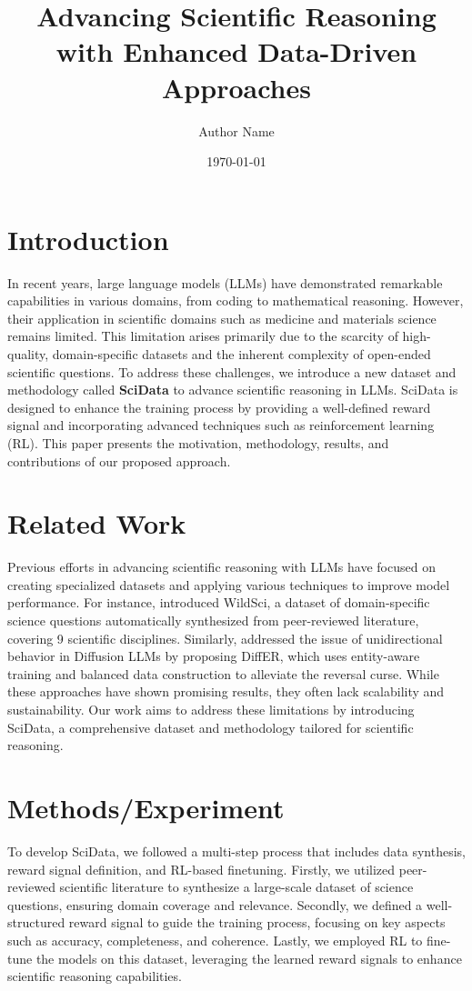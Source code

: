 \documentclass{article}
\title{Advancing Scientific Reasoning with Enhanced Data-Driven Approaches}
\author{Author Name}
\date{\today}
\begin{document}
\maketitle

\section{Introduction}
In recent years, large language models (LLMs) have demonstrated remarkable capabilities in various domains, from coding to mathematical reasoning. However, their application in scientific domains such as medicine and materials science remains limited. This limitation arises primarily due to the scarcity of high-quality, domain-specific datasets and the inherent complexity of open-ended scientific questions. To address these challenges, we introduce a new dataset and methodology called \textbf{SciData} to advance scientific reasoning in LLMs. SciData is designed to enhance the training process by providing a well-defined reward signal and incorporating advanced techniques such as reinforcement learning (RL). This paper presents the motivation, methodology, results, and contributions of our proposed approach.

\section{Related Work}
Previous efforts in advancing scientific reasoning with LLMs have focused on creating specialized datasets and applying various techniques to improve model performance. For instance, \cite{liu2026wildsciadvancingscientificreasoning} introduced WildSci, a dataset of domain-specific science questions automatically synthesized from peer-reviewed literature, covering 9 scientific disciplines. Similarly, \cite{he2026differdiffusionentityrelationmodeling} addressed the issue of unidirectional behavior in Diffusion LLMs by proposing DiffER, which uses entity-aware training and balanced data construction to alleviate the reversal curse. While these approaches have shown promising results, they often lack scalability and sustainability. Our work aims to address these limitations by introducing SciData, a comprehensive dataset and methodology tailored for scientific reasoning.

\section{Methods/Experiment}
To develop SciData, we followed a multi-step process that includes data synthesis, reward signal definition, and RL-based finetuning. Firstly, we utilized peer-reviewed scientific literature to synthesize a large-scale dataset of science questions, ensuring domain coverage and relevance. Secondly, we defined a well-structured reward signal to guide the training process, focusing on key aspects such as accuracy, completeness, and coherence. Lastly, we employed RL to fine-tune the models on this dataset, leveraging the learned reward signals to enhance scientific reasoning capabilities.
\end{document}
